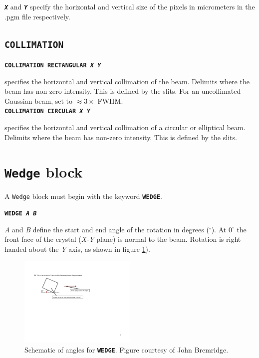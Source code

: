\documentclass[a4paper]{article}
\newcommand{\Class}[1]{\texttt{#1}\xspace}
\newcommand{\Keyword}[1]{\texttt{\textbf{#1}}\xspace}
\newcommand{\SB}{\\[0.2em]}
\begin{document}
\Keyword{\textit{X}} and \Keyword{\textit{Y}} specify the horizontal and vertical size of the pixels in micrometers in the .pgm file respectively.

\subsection{\Keyword{COLLIMATION}}

\noindent \Keyword{COLLIMATION RECTANGULAR \textit{X Y}}

specifies the horizontal and vertical collimation of the beam.
Delimits where the beam has non-zero intensity.
This is defined by the slits.
For an uncollimated Gaussian beam, set to $\approx 3 \times$ FWHM. \SB


\noindent \Keyword{COLLIMATION CIRCULAR \textit{X Y}}

specifies the horizontal and vertical collimation of a circular or elliptical beam.
Delimits where the beam has non-zero intensity.
This is defined by the slits.

%

\section{\Class{Wedge} block}

A \Class{Wedge} block must begin with the keyword \Keyword{WEDGE}.

\Keyword{WEDGE \textit{A B}}

\textit{A} and \textit{B} define the start and end angle of the rotation in degrees ($^\circ$). At $0^\circ$ the front face of the crystal (\textit{X-Y} plane) is normal to the beam. Rotation is right handed about the \textit{Y} axis, as shown in figure \ref{fig:anglePhi}).
\begin{figure}[h!]
\centering
\includegraphics[width=0.5\textwidth]{Figs-for-Markus-from-JB-19-5-13-3.pdf}
\caption{Schematic of angles for \Keyword{WEDGE}. Figure courtesy of John Bremridge.}
\label{fig:anglePhi}
\end{figure}
\end{document}
